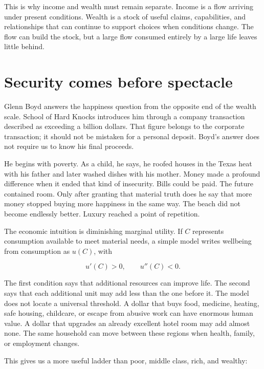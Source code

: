 This is why income and wealth must remain separate. Income is a flow arriving
under present conditions. Wealth is a stock of useful claims, capabilities, and
relationships that can continue to support choices when conditions change. The
flow can build the stock, but a large flow consumed entirely by a large life
leaves little behind.

\section{Security comes before spectacle}

Glenn Boyd answers the happiness question from the opposite end of the wealth
scale. School of Hard Knocks introduces him through a company transaction
described as exceeding a billion dollars. That figure belongs to the corporate
transaction; it should not be mistaken for a personal deposit. Boyd's answer
does not require us to know his final proceeds.

He begins with poverty. As a child, he says, he roofed houses in the Texas heat
with his father and later washed dishes with his mother. Money made a profound
difference when it ended that kind of insecurity. Bills could be paid. The
future contained room. Only after granting that material truth does he say that
more money stopped buying more happiness in the same way. The beach did not
become endlessly better. Luxury reached a point of repetition.

The economic intuition is diminishing marginal utility. If $C$ represents
consumption available to meet material needs, a simple model writes wellbeing
from consumption as $u(C)$, with

\begin{equation}
u'(C) > 0, \qquad u''(C) < 0.
\end{equation}

The first condition says that additional resources can improve life. The second
says that each additional unit may add less than the one before it. The model
does not locate a universal threshold. A dollar that buys food, medicine,
heating, safe housing, childcare, or escape from abusive work can have enormous
human value. A dollar that upgrades an already excellent hotel room may add
almost none. The same household can move between these regions when health,
family, or employment changes.

This gives us a more useful ladder than poor, middle class, rich, and wealthy:


